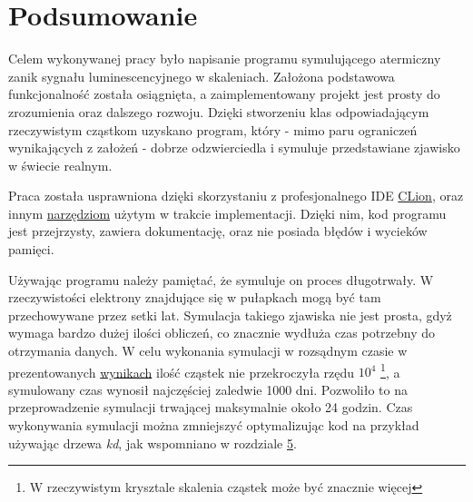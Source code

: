 \chapter{Podsumowanie}

Celem wykonywanej pracy było napisanie programu symulującego atermiczny zanik sygnału luminescencyjnego w skaleniach.  Założona podstawowa funkcjonalność została osiągnięta, a zaimplementowany projekt jest prosty do zrozumienia oraz dalszego rozwoju. Dzięki stworzeniu klas odpowiadającym rzeczywistym cząstkom uzyskano program, który - mimo paru ograniczeń wynikających z założeń - dobrze odzwierciedla i symuluje przedstawiane zjawisko w świecie realnym.

Praca została usprawniona dzięki skorzystaniu z profesjonalnego IDE \hyperref[tech:clion]{CLion}, oraz innym \hyperref[tech:all]{narzędziom} użytym w trakcie implementacji. Dzięki nim, kod programu jest przejrzysty, zawiera dokumentację, oraz nie posiada błędów i wycieków pamięci.

Używając programu należy pamiętać, że symuluje on proces długotrwały. W rzeczywistości elektrony znajdujące się w pułapkach mogą być tam przechowywane przez setki lat. Symulacja takiego zjawiska nie jest prosta, gdyż wymaga bardzo dużej ilości obliczeń, co znacznie wydłuża czas potrzebny do otrzymania danych. W celu wykonania symulacji w rozsądnym czasie w  prezentowanych  \hyperref[wynik:wykres]{wynikach} ilość cząstek nie przekroczyła rzędu $10^{4}$ \footnote{W rzeczywistym krysztale skalenia cząstek może być znacznie więcej}, a symulowany czas wynosił najczęściej zaledwie 1000 dni. Pozwoliło to na przeprowadzenie symulacji trwającej maksymalnie około 24 godzin. Czas wykonywania symulacji można zmniejszyć optymalizując kod na przykład używając drzewa \emph{kd}, jak wspomniano w rozdziale \hyperref[rozwoj:1]{5}. 
